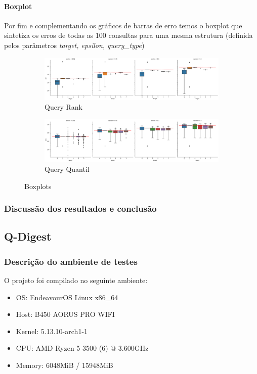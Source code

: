 \documentclass[11pt]{article}
\begin{document}
\paragraph{Boxplot}

Por fim e complementando os gráficos de barras de erro temos o boxplot que sintetiza os erros de todas as 100 consultas para uma mesma estrutura (definida pelos parâmetros \emph{target, epsilon, query\_type})


\begin{figure}[H]
\begin{subfigure}{.5\textwidth}
  \centering
  \includegraphics[width=.9\linewidth]{../../img/RANK_boxplot_erros.png}
  \caption{Query Rank}
  \label{fig:sub-first}
\end{subfigure}
\begin{subfigure}{.5\textwidth}
  \centering
  \includegraphics[width=.9\linewidth]{../../img/QUANTIL_boxplot_erros.png}
  \caption{Query Quantil}
\end{subfigure}
\caption{Boxplots}
\end{figure}



\subsubsection{Discussão dos resultados e conclusão}

\subsection{Q-Digest}
\subsubsection{Descrição do ambiente de testes}

O projeto foi compilado no seguinte ambiente:
\begin{itemize}
  \item OS: EndeavourOS Linux x86\_64
  \item Host: B450 AORUS PRO WIFI
  \item Kernel: 5.13.10-arch1-1
  \item CPU: AMD Ryzen 5 3500 (6) @ 3.600GHz
  \item Memory: 6048MiB / 15948MiB
\end{itemize}
\end{document}
